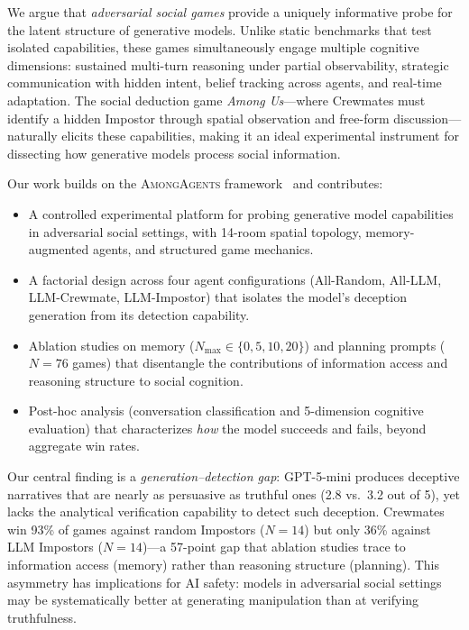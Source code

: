 \documentclass{article}
\begin{document}
We argue that \emph{adversarial social games} provide a uniquely informative probe for the latent structure of generative models. Unlike static benchmarks that test isolated capabilities, these games simultaneously engage multiple cognitive dimensions: sustained multi-turn reasoning under partial observability, strategic communication with hidden intent, belief tracking across agents, and real-time adaptation. The social deduction game \textit{Among Us}---where Crewmates must identify a hidden Impostor through spatial observation and free-form discussion---naturally elicits these capabilities, making it an ideal experimental instrument for dissecting how generative models process social information.

Our work builds on the \textsc{AmongAgents} framework~\cite{chi2024amongagents} and contributes:

\begin{itemize}
    \item A controlled experimental platform for probing generative model capabilities in adversarial social settings, with 14-room spatial topology, memory-augmented agents, and structured game mechanics.
    \item A factorial design across four agent configurations (All-Random, All-LLM, LLM-Crewmate, LLM-Impostor) that isolates the model's deception generation from its detection capability.
    \item Ablation studies on memory ($N_{\max} \in \{0, 5, 10, 20\}$) and planning prompts ($N=76$ games) that disentangle the contributions of information access and reasoning structure to social cognition.
    \item Post-hoc analysis (conversation classification and 5-dimension cognitive evaluation) that characterizes \emph{how} the model succeeds and fails, beyond aggregate win rates.
\end{itemize}

Our central finding is a \emph{generation--detection gap}: GPT-5-mini produces deceptive narratives that are nearly as persuasive as truthful ones (2.8 vs.\ 3.2 out of 5), yet lacks the analytical verification capability to detect such deception. Crewmates win 93\% of games against random Impostors ($N=14$) but only 36\% against LLM Impostors ($N=14$)---a 57-point gap that ablation studies trace to information access (memory) rather than reasoning structure (planning). This asymmetry has implications for AI safety: models in adversarial social settings may be systematically better at generating manipulation than at verifying truthfulness.
\end{document}
